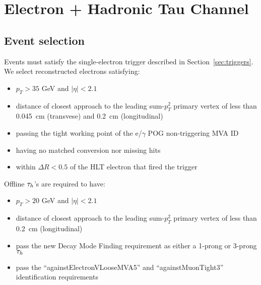 \section{Electron + Hadronic Tau Channel}\label{sec:eTauhad}


\subsection{Event selection}\label{sec:et_selection}


Events must satisfy the single-electron trigger described in
Section~\ref{sec:triggers}.  We select reconstructed electrons
satisfying:
\begin{itemize}
  \item $p_T>35$ GeV and $\vert\eta\vert<2.1$
  \item distance of closest approach to the leading 
sum-$p_T^2$ primary vertex of less than 0.045~cm 
(transvese) and 0.2~cm (longitudinal)
  \item passing the tight working point of the e/$\gamma$ 
POG non-triggering MVA ID
  \item having no matched conversion nor missing hits
  \item within $\Delta R<0.5$ of the HLT electron that fired the trigger

\end{itemize}


Offline $\tau_h$'s are required to have:
\begin{itemize}
  \item $p_{T}> 20$ GeV and $\vert \eta \vert < 2.1$
  \item distance of closest approach to the leading
sum-$p_T^2$ primary vertex of less than 0.2~cm (longitudinal)
  \item pass the new Decay Mode Finding requirement as 
either a 1-prong or 3-prong $\tau_h$
  \item pass the ``againstElectronVLooseMVA5'' and
``againstMuonTight3'' identification requirements
\end{itemize}

